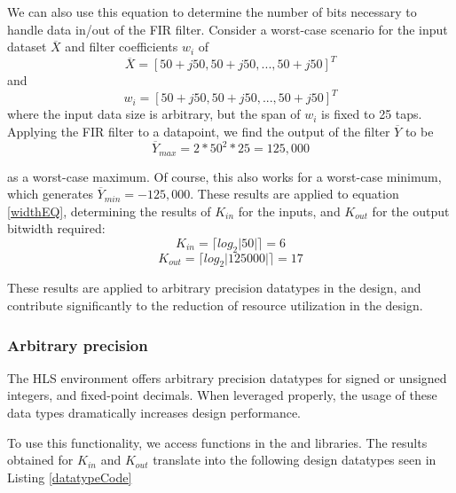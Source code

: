 \documentclass[11pt]{report}
\begin{document}
We can also use this equation to determine the number of bits necessary to handle data in/out of the FIR filter. Consider a worst-case scenario for the input dataset $\overline X$ and filter coefficients $w_i$ of
\begin{equation*}
	\overline X = [50 + j50, 50 + j50,...,50+j50]^T
\end{equation*}
and
\begin{equation*}
	w_i = [50 + j50, 50 + j50,...,50+j50]^T
\end{equation*}
where the input data size is arbitrary, but the span of $w_i$ is fixed to 25 taps. Applying the FIR filter to a datapoint, we find the output of the filter $\overline Y$ to be
\begin{equation*}
	\overline Y_{max} = 2 * 50^2 * 25 = 125,000 
\end{equation*}

as a worst-case maximum. Of course, this also works for a worst-case minimum, which generates  $\overline Y_{min} = -125,000$. These results are applied to equation \ref{widthEQ}, determining the results of $K_{in}$ for the inputs, and $K_{out}$ for the output bitwidth required:
\begin{equation}
	K_{in} = \lceil log_{2}{|50|} \rceil = 6
\end{equation}
\begin{equation}
	K_{out} = \lceil log_{2}{|125000|} \rceil = 17
\end{equation}

These results are applied to arbitrary precision datatypes in the design, and contribute significantly to the reduction of resource utilization in the design.

\subsubsection{Arbitrary precision}

The HLS environment offers arbitrary precision datatypes for signed or unsigned integers, and fixed-point decimals. When leveraged properly, the usage of these data types dramatically increases design performance. 

To use this functionality, we access functions in the  and  libraries. The results obtained for $K_{in}$ and $K_{out}$ translate into the following design datatypes seen in Listing \ref{datatypeCode}


\begin{quote}
\begin{singlespace}
    
\end{singlespace}
\end{quote}
\end{document}
